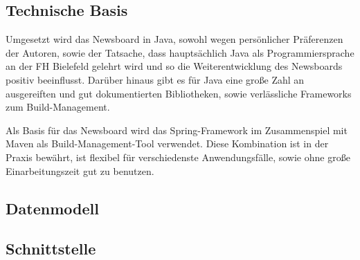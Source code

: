 \subsection{Technische Basis}
Umgesetzt wird das Newsboard in Java, sowohl wegen persönlicher Präferenzen der Autoren,
sowie der Tatsache, dass hauptsächlich Java als Programmiersprache
an der FH Bielefeld gelehrt wird und so die Weiterentwicklung des Newsboards
positiv beeinflusst. Darüber hinaus gibt es für Java eine große Zahl an ausgereiften
und gut dokumentierten Bibliotheken, sowie verlässliche Frameworks zum Build-Management.

Als Basis für das Newsboard wird das Spring-Framework im Zusammenspiel mit Maven
als Build-Management-Tool verwendet. Diese Kombination ist in der Praxis bewährt,
ist flexibel für verschiedenste Anwendungsfälle, sowie ohne große Einarbeitungszeit
gut zu benutzen.

\subsection{Datenmodell}

\subsection{Schnittstelle}